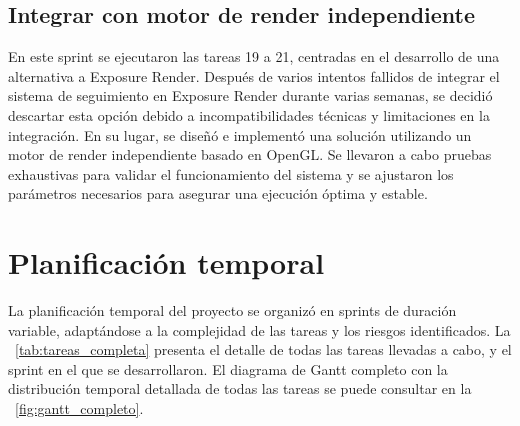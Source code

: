 \subsection{Integrar con motor de render independiente}
En este sprint se ejecutaron las tareas 19 a 21, centradas en el desarrollo de una alternativa a Exposure Render. Después de varios intentos fallidos de integrar el sistema de seguimiento en Exposure Render durante varias semanas, se decidió descartar esta opción debido a incompatibilidades técnicas y limitaciones en la integración. En su lugar, se diseñó e implementó una solución utilizando un motor de render independiente basado en OpenGL. Se llevaron a cabo pruebas exhaustivas para validar el funcionamiento del sistema y se ajustaron los parámetros necesarios para asegurar una ejecución óptima y estable.

\section{Planificación temporal}
La planificación temporal del proyecto se organizó en sprints de duración variable, adaptándose a la complejidad de las tareas y los riesgos identificados. La \tablename~\ref{tab:tareas_completa} presenta el detalle de todas las tareas llevadas a cabo, y el sprint en el que se desarrollaron. El diagrama de Gantt completo con la distribución temporal detallada de todas las tareas se puede consultar en la \figurename~\ref{fig:gantt_completo}.

